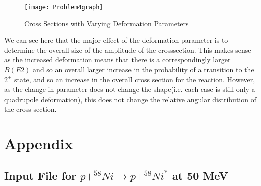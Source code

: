 \documentclass[11pt]{article} %
\begin{document}
\begin{figure}[hbt!]
\centering
\texttt{[image: Problem4graph]} 
\caption{Cross Sections with Varying Deformation Parameters}
\end{figure}
\FloatBarrier
 
We can see here that the major effect of the deformation parameter is to determine the overall size of the amplitude of the crosssection. This makes sense as the increased deformation means that there is a correspondingly larger $B(E2)$ and so an overall larger increase in the probability of a transition to the $2^+$ state, and so an increase in the overall cross section for the reaction. However, as the change in parameter does not change the shape(i.e. each case is still only a quadrupole deformation), this does not change the relative angular distribution of the cross section.

\section{Appendix}

\subsection{Input File for $p+^{58}Ni\rightarrow p+^{58}Ni^*$ at 50 MeV}


\end{document}
